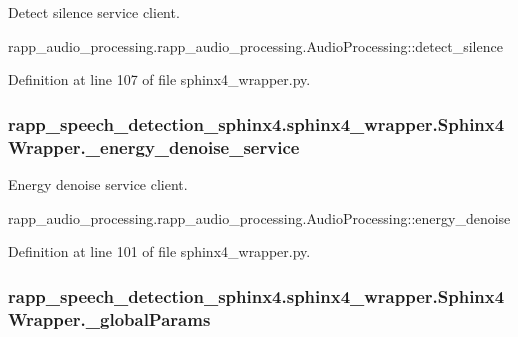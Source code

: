 Detect silence service client. 

rapp\-\_\-audio\-\_\-processing.\-rapp\-\_\-audio\-\_\-processing.\-Audio\-Processing\-::detect\-\_\-silence 

Definition at line 107 of file sphinx4\-\_\-wrapper.\-py.

\hypertarget{classrapp__speech__detection__sphinx4_1_1sphinx4__wrapper_1_1Sphinx4Wrapper_a72b86a6db9d93651c9202cb5cbf67c4b}{
\subsubsection[{\-\_\-energy\-\_\-denoise\-\_\-service}]{\setlength{\rightskip}{0pt plus 5cm}rapp\-\_\-speech\-\_\-detection\-\_\-sphinx4.\-sphinx4\-\_\-wrapper.\-Sphinx4\-Wrapper.\-\_\-energy\-\_\-denoise\-\_\-service\hspace{0.3cm}{\ttfamily [private]}}}\label{classrapp__speech__detection__sphinx4_1_1sphinx4__wrapper_1_1Sphinx4Wrapper_a72b86a6db9d93651c9202cb5cbf67c4b}


Energy denoise service client. 

rapp\-\_\-audio\-\_\-processing.\-rapp\-\_\-audio\-\_\-processing.\-Audio\-Processing\-::energy\-\_\-denoise 

Definition at line 101 of file sphinx4\-\_\-wrapper.\-py.

\hypertarget{classrapp__speech__detection__sphinx4_1_1sphinx4__wrapper_1_1Sphinx4Wrapper_aa4c29cee22a852acb4b6567e5bf8fafe}{
\subsubsection[{\-\_\-global\-Params}]{\setlength{\rightskip}{0pt plus 5cm}rapp\-\_\-speech\-\_\-detection\-\_\-sphinx4.\-sphinx4\-\_\-wrapper.\-Sphinx4\-Wrapper.\-\_\-global\-Params\hspace{0.3cm}{\ttfamily [private]}}}\label{classrapp__speech__detection__sphinx4_1_1sphinx4__wrapper_1_1Sphinx4Wrapper_aa4c29cee22a852acb4b6567e5bf8fafe}


